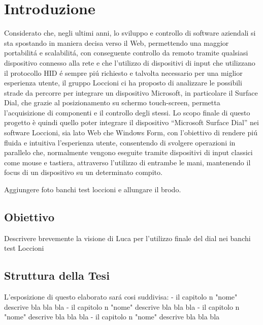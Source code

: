 \chapter{Introduzione}
\label{chap:intro}

Considerato che, negli ultimi anni, lo sviluppo e controllo di software aziendali si sta spostando in maniera decisa verso il Web, permettendo una maggior portabilitá e scalabilitá, con conseguente controllo da remoto tramite qualsiasi dispositivo connesso alla rete e che l’utilizzo di dispositivi di input che utilizzano il protocollo HID é sempre piú richiesto e talvolta necessario per una miglior esperienza utente, il gruppo Loccioni ci ha proposto di analizzare le possibili strade da percorre per integrare un dispositivo Microsoft, in particolare il Surface Dial, che grazie al posizionamento su schermo touch-screen, permetta l’acquisizione di componenti e il controllo degli stessi.
Lo scopo finale di questo progetto è quindi quello poter integrare il dispositivo “Microsoft Surface Dial” nei software Loccioni, sia lato Web che Windows Form, con l'obiettivo di rendere piú fluida e intuitiva l’esperienza utente, consentendo di svolgere operazioni in parallelo che, normalmente vengono eseguite tramite dispositivi di input classici come mouse e tastiera, attraverso l’utilizzo di entrambe le mani, mantenendo il focus di un dispositivo su un determinato compito.

Aggiungere foto banchi test loccioni e allungare il brodo.

\section{Obiettivo}
Descrivere brevemente la visione di Luca per l'utilizzo finale del dial nei banchi test Loccioni

\section{Struttura della Tesi}
L'esposizione di questo elaborato sará cosi suddivisa:
- il capitolo n "nome" descrive bla bla bla
- il capitolo n "nome" descrive bla bla bla
- il capitolo n "nome" descrive bla bla bla
- il capitolo n "nome" descrive bla bla bla